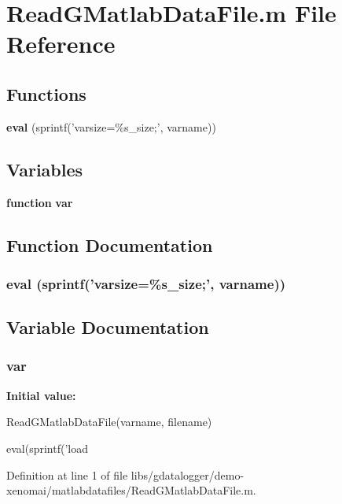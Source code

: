 \section{ReadGMatlabDataFile.m File Reference}
\label{libs_2gdatalogger_2demo-xenomai_2matlabdatafiles_2ReadGMatlabDataFile_8m}
\subsection*{Functions}
\begin{DoxyCompactItemize}
\item 
{\bf eval} (sprintf('varsize=\%s\_\-size;', varname))
\end{DoxyCompactItemize}
\subsection*{Variables}
\begin{DoxyCompactItemize}
\item 
{\bf function} {\bf var}
\end{DoxyCompactItemize}


\subsection{Function Documentation}
\subsubsection[{eval}]{\setlength{\rightskip}{0pt plus 5cm}eval (sprintf('varsize=\%s\_\-size;', varname))}\label{libs_2gdatalogger_2demo-xenomai_2matlabdatafiles_2ReadGMatlabDataFile_8m_a6f217d64e43fd40c2eb04a81e57d7a1f}


\subsection{Variable Documentation}
\subsubsection[{var}]{ {\bf var}}\label{libs_2gdatalogger_2demo-xenomai_2matlabdatafiles_2ReadGMatlabDataFile_8m_a4fdd13e26a831c0dff92f623df42f347}
{\bfseries Initial value:}
\begin{DoxyCode}
 ReadGMatlabDataFile(varname, filename)

eval(sprintf('load %
\end{DoxyCode}


Definition at line 1 of file libs/gdatalogger/demo-\/xenomai/matlabdatafiles/ReadGMatlabDataFile.m.